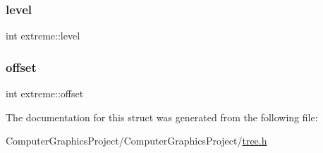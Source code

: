 \mbox{\label{structextreme_a80adaa7fa8a2fd6b51e092462628af3e}} 
\subsubsection{\texorpdfstring{level}{level}}
{\footnotesize\ttfamily int extreme\+::level}

\mbox{\label{structextreme_a4a01f7889effe05776f9c7aab111452a}} 
\subsubsection{\texorpdfstring{offset}{offset}}
{\footnotesize\ttfamily int extreme\+::offset}



The documentation for this struct was generated from the following file\+:\begin{DoxyCompactItemize}
\item 
Computer\+Graphics\+Project/\+Computer\+Graphics\+Project/\hyperlink{tree_8h}{tree.\+h}\end{DoxyCompactItemize}
